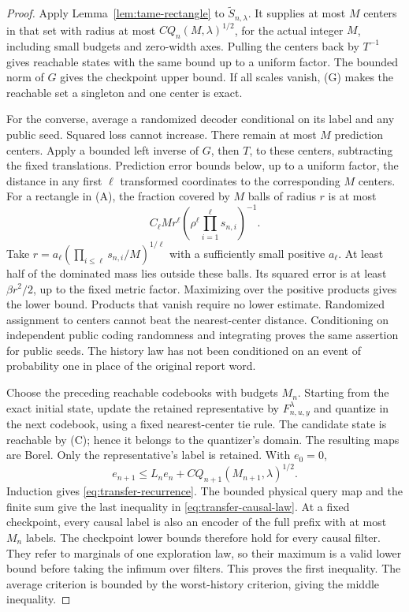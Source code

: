 \begin{proof}
Apply Lemma~\ref{lem:tame-rectangle} to $\widetilde S_{n,\lambda}$.
It supplies at most $M$ centers in that set with radius at most
$C Q_n(M,\lambda)^{1/2}$, for the actual integer $M$, including
small budgets and zero-width axes. Pulling the centers back by $T^{-1}$
gives reachable states with the same bound up to a uniform factor.
The bounded norm of $G$ gives the checkpoint upper bound. If all scales
vanish, (G) makes the reachable set a singleton and one center is exact.

For the converse, average a randomized decoder conditional on its label
and any public seed. Squared loss cannot increase. There remain at most
$M$ prediction centers. Apply a bounded left inverse of $G$, then $T$,
to these centers, subtracting the fixed translations. Prediction error
bounds below, up to a uniform factor, the distance in any first
$\ell$ transformed coordinates to the corresponding $M$ centers.
For a rectangle in (A), the fraction covered by $M$ balls of radius $r$
is at most
\[
 C_\ell M r^\ell\left(\rho^\ell
                              \prod_{i=1}^{\ell}s_{n,i}\right)^{-1}.
\]
Take $r=a_\ell(\prod_{i\le\ell}s_{n,i}/M)^{1/\ell}$ with a
sufficiently small positive $a_\ell$. At least half of the dominated
mass lies outside these balls. Its squared error is at least
$\beta r^2/2$, up to the fixed metric factor. Maximizing over the
positive products gives the lower bound. Products that vanish require
no lower estimate. Randomized assignment to centers cannot beat the
nearest-center distance. Conditioning on independent public coding
randomness and integrating proves the same assertion for public seeds.
The history law has not been conditioned on an event of probability one
in place of the original report word.

Choose the preceding reachable codebooks with budgets $M_n$.
Starting from the exact initial state, update the retained representative
by $F_{n,u,y}^{\lambda}$ and quantize in the next codebook, using a
fixed nearest-center tie rule. The candidate state is reachable by (C);
hence it belongs to the quantizer's domain. The resulting maps are
Borel. Only the representative's label is retained. With $e_0=0$,
\[
 e_{n+1}\le L_n e_n+C Q_{n+1}(M_{n+1},\lambda)^{1/2}.
\]
Induction gives \eqref{eq:transfer-recurrence}. The bounded physical
query map and the finite sum give the last inequality in
\eqref{eq:transfer-causal-law}. At a fixed checkpoint, every causal
label is also an encoder of the full prefix with at most $M_n$ labels.
The checkpoint lower bounds therefore hold for every causal filter.
They refer to marginals of one exploration law, so their maximum is a
valid lower bound before taking the infimum over filters. This proves
the first inequality. The average criterion is bounded by the
worst-history criterion, giving the middle inequality.
\end{proof}

